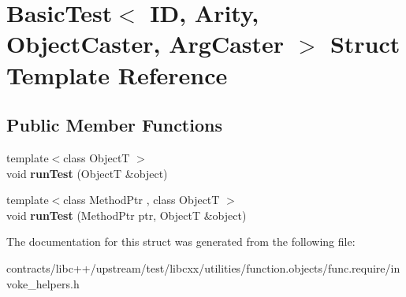 \hypertarget{struct_basic_test}{}\section{Basic\+Test$<$ ID, Arity, Object\+Caster, Arg\+Caster $>$ Struct Template Reference}
\label{struct_basic_test}
\subsection*{Public Member Functions}
\begin{DoxyCompactItemize}
\item 
\mbox{\label{struct_basic_test_a972bf1454e58b61fd1b5b02d24cd6341}} 
{\footnotesize template$<$class ObjectT $>$ }\\void {\bfseries run\+Test} (ObjectT \&object)
\item 
\mbox{\label{struct_basic_test_a1e52877f602b073c86f1babfebf813f1}} 
{\footnotesize template$<$class Method\+Ptr , class ObjectT $>$ }\\void {\bfseries run\+Test} (Method\+Ptr ptr, ObjectT \&object)
\end{DoxyCompactItemize}


The documentation for this struct was generated from the following file\+:\begin{DoxyCompactItemize}
\item 
contracts/libc++/upstream/test/libcxx/utilities/function.\+objects/func.\+require/invoke\+\_\+helpers.\+h\end{DoxyCompactItemize}
